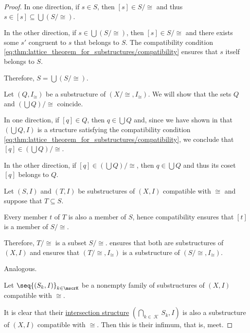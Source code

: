 \begin{proof}
  In one direction, if \( s \in S \), then \( [s] \in S / {\cong} \) and thus \( s \in [s] \subseteq \bigcup (S / {\cong}) \).

  In the other direction, if \( s \in \bigcup (S / {\cong}) \), then \( [s] \in S / {\cong} \) and there exists some \( s' \) congruent to \( s \) that belongs to \( S \). The compatibility condition \eqref{eq:thm:lattice_theorem_for_substructures/compatibility} ensures that \( s \) itself belongs to \( S \).

  Therefore, \( S = \bigcup(S / {\cong}) \).

   Let \( (Q, I_\cong) \) be a substructure of \( (X / {\cong}, I_\cong) \). We will show that the sets \( Q \) and \( (\bigcup Q) / {\cong} \) coincide.

  In one direction, if \( [q] \in Q \), then \( q \in \bigcup Q \) and, since we have shown in  that \( (\bigcup Q, I) \) is a structure satisfying the compatibility condition \eqref{eq:thm:lattice_theorem_for_substructures/compatibility}, we conclude that \( [q] \in (\bigcup Q) / {\cong} \).

  In the other direction, if \( [q] \in (\bigcup Q) / {\cong} \), then \( q \in \bigcup Q \) and thus its coset \( [q] \) belongs to \( Q \).

   Let \( (S, I) \) and \( (T, I) \) be substructures of \( (X, I) \) compatible with \( {\cong} \) and suppose that \( T \subseteq S \).

  Every member \( t \) of \( T \) is also a member of \( S \), hence compatibility ensures that \( [t] \) is a member of \( S / {\cong} \).

  Therefore, \( T / {\cong} \) is a subset \( S / {\cong} \).  ensures that both are substructures of \( (X, I) \) and  ensures that \( (T / {\cong}, I_\cong) \) is a substructure of \( (S / {\cong}, I_\cong) \).

   Analogous.

   Let \( \seq{ (S_k, I) }_{k \in \mscrK} \) be a nonempty family of substructures of \( (X, I) \) compatible with \( {\cong} \).

  It is clear that their \hyperref[thm:intersection_substructure]{intersection structure} \( (\bigcap_{k \in \mscrK} S_k, I) \) is also a substructure of \( (X, I) \) compatible with \( {\cong} \). Then this is their infimum, that is, meet.


\end{proof}

